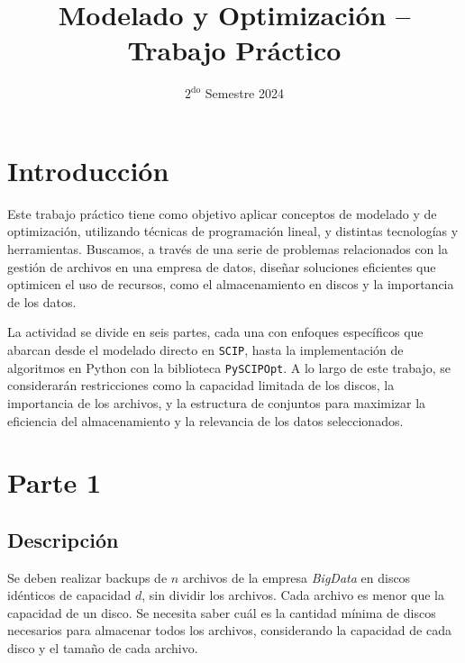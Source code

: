 \documentclass[11pt, a4paper, pdftex]{article}
\title{
	\huge Modelado y Optimización -- Trabajo Práctico\\
}
\author{
	\Lu \and \Xime
}
\date{\small $\text{2}^{\text{do}}$ Semestre 2024
}
\begin{document}
\renewcommand{\contentsname}{Contenidos}
\renewcommand{\listfigurename}{Listado de Figuras}
\renewcommand{\listtablename}{Listado de Tablas}
\renewcommand{\tablename}{Tabla}

\newcommand{\minimize}{\texttt{Minimize}\quad\,\,}
\newcommand{\maximize}{\texttt{Maximize}\quad\,\,}
\newcommand{\subjto}{\texttt{Subject to}\quad}

\maketitle

\tableofcontents

\newpage

\section{Introducción}

Este trabajo práctico tiene como objetivo aplicar conceptos de modelado
y de optimización, utilizando técnicas de programación lineal, y distintas
tecnologías y herramientas. Buscamos, a través de una serie de problemas
relacionados con la gestión de archivos en una empresa de datos, diseñar
soluciones eficientes que optimicen el uso de recursos, como el
almacenamiento en discos y la importancia de los datos.

La actividad se divide en seis partes, cada una con enfoques específicos
que abarcan desde el modelado directo en \verb|SCIP|, hasta la
implementación de algoritmos en Python con la biblioteca
\verb|PySCIPOpt|. A lo largo de este trabajo, se considerarán restricciones
como la capacidad limitada de los discos, la importancia de los archivos,
y la estructura de conjuntos para maximizar la eficiencia del
almacenamiento y la relevancia de los datos seleccionados.

\newpage
\section{Parte 1}\label{primera:parte}

\subsection{Descripción}

Se deben realizar backups de $n$ archivos de la empresa \emph{BigData}
en discos idénticos de capacidad $d$, sin dividir los archivos. Cada
archivo es menor que la capacidad de un disco. Se necesita saber cuál es
la cantidad mínima de discos necesarios para almacenar todos los
archivos, considerando la capacidad de cada disco y el tamaño de cada
archivo. 
\end{document}
